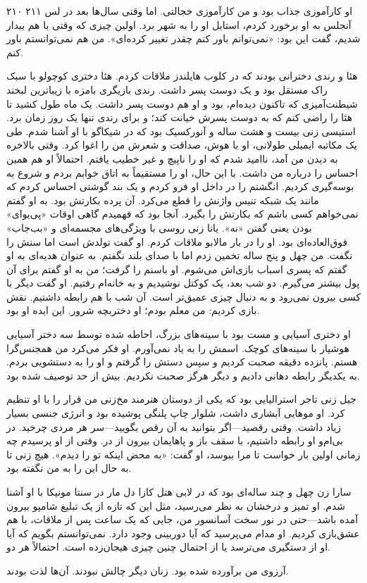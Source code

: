 ۲۱۰  
۲۱۱  
او کارآموزی جذاب بود و من کارآموزی خجالتی. اما وقتی سال‌ها بعد در لس آنجلس به او برخورد کردم، استایل او را به شهر برد. اولین چیزی که وقتی با هم بیدار شدیم، گفت این بود: «نمی‌توانم باور کنم چقدر تغییر کرده‌ای». من هم نمی‌توانستم باور کنم.

هئا و رندی دخترانی بودند که در کلوب هایلندز ملاقات کردم. هئا دختری کوچولو با سبک راک مستقل بود و یک دوست پسر داشت. رندی بازیگری بامزه با زیباترین لبخند شیطنت‌آمیزی که تاکنون دیده‌ام، بود و او هم دوست پسر داشت. یک ماه طول کشید تا هئا را راضی کنم که به دوست پسرش خیانت کند؛ و برای رندی تنها یک روز زمان برد.
استیسی زنی بیست و هشت ساله و آنورکسیک بود که در شیکاگو با او آشنا شدم. طی یک مکاتبه ایمیلی طولانی، او با هوش، صداقت و شعرش من را اغوا کرد. وقتی بالاخره به دیدن من آمد، ناامید شدم که او را ناپیچ و غیر خطیب یافتم. احتمالاً او هم همین احساس را درباره من داشت. با این حال، او را مستقیماً به اتاق خوابم بردم و شروع به بوسه‌گیری کردیم. انگشتم را در داخل او فرو کردم و یک بند گوشتی احساس کردم که مانند یک شبکه تنیس واژنش را قطع می‌کرد. آن پرده بکارتش بود. به او گفتم نمی‌خواهم کسی باشم که بکارتش را بگیرد. آنجا بود که فهمیدم گاهی اوقات «پی‌یو‌ای» بودن یعنی گفتن «نه».
یانا زنی روسی با ویژگی‌های مجسمه‌ای و «بب‌جاب» فوق‌العاده‌ای بود. او را در بار مالابو ملاقات کردم. او گفت تولدش است اما سنش را نگفت. من چهل و پنج ساله تخمین زدم اما با صدای بلند نگفتم. به عنوان هدیه‌ای به او گفتم که پسری اسباب بازی‌اش می‌شوم. او باسنم را گرفت؛ من به او گفتم برای آن پول بیشتر می‌گیرم. دو شب بعد، یک کوکتل نوشیدیم و به خانه‌ام رفتیم.
او گفت دیگر با کسی بیرون نمی‌رود و به دنبال چیزی عمیق‌تر است. آن شب با هم رابطه داشتیم. نقش بازی کردیم: من معلم بودم؛ او دختربچه شرور. این ایده او بود.

او دختری آسیایی و مست بود با سینه‌های بزرگ، احاطه شده توسط سه دختر آسیایی هوشیار با سینه‌های کوچک. اسمش را به یاد نمی‌آورم. او فکر می‌کرد من همجنس‌گرا هستم. پانزده دقیقه صحبت کردیم و سپس دستش را گرفتم و او را به دستشویی بردم. به یکدیگر رابطه دهانی دادیم و دیگر هرگز صحبت نکردیم. بیش از حد توصیف شده بود.

جیل زنی تاجر استرالیایی بود که یکی از دوستان هنرمند مخ‌زنی من قرار را با او تنظیم کرد. او موهایی آبشاری داشت، شلوار چاپ پلنگی پوشیده بود و انرژی جنسی بسیار زیاد داشت. وقتی رقصید—اگر بتوانید به آن رقص بگویید—سر هر مردی چرخید. در بی‌ام‌و او رابطه داشتیم، با سقف باز و پاهایمان بیرون از در. وقتی از او پرسیدم چه زمانی اولین بار خواست تا مرا ببوسد، او گفت: «به محض اینکه تو را دیدم». هیچ زنی تا به حال این را به من نگفته بود.

سارا زن چهل و چند ساله‌ای بود که در لابی هتل کازا دل مار در سنتا مونیکا با او آشنا شدم. او تمیز و درخشان به نظر می‌رسید، مثل این که تازه از یک تبلیغ شامپو بیرون آمده باشد—حتی در نور سخت آسانسور من، جایی که یک ساعت پس از ملاقات، با هم عشق‌بازی کردیم. او مدام می‌پرسید که آیا دوربینی وجود دارد. نمی‌توانستم بگویم که آیا او از دستگیری می‌ترسد یا از احتمال چنین چیزی هیجان‌زده است. احتمالاً هر دو.

آرزوی من برآورده شده بود. زنان دیگر چالش نبودند. آن‌ها لذت بودند.
